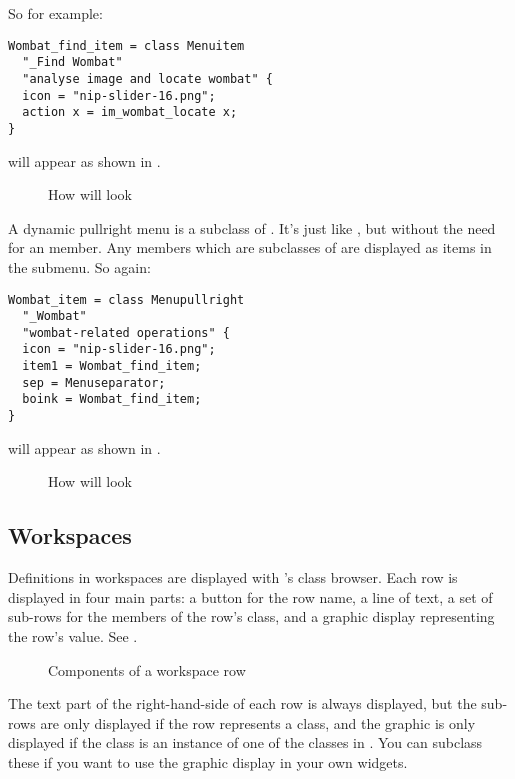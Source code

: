 So for example:

\begin{verbatim}
Wombat_find_item = class Menuitem
  "_Find Wombat"
  "analyse image and locate wombat" {
  icon = "nip-slider-16.png";
  action x = im_wombat_locate x;
}
\end{verbatim}

\noindent
will appear as shown in .

\begin{figure}
\caption{How  will look}
\end{figure}

A dynamic pullright menu is a subclass of . It's just like
, but without the need for an  member. Any members
which are subclasses of  are displayed as items in the submenu. So
again:

\begin{verbatim}
Wombat_item = class Menupullright
  "_Wombat"
  "wombat-related operations" {
  icon = "nip-slider-16.png";
  item1 = Wombat_find_item;
  sep = Menuseparator;
  boink = Wombat_find_item;
}
\end{verbatim}

\noindent
will appear as shown in .

\begin{figure}
\caption{How  will look}
\end{figure}

\subsection{Workspaces}

Definitions in workspaces are displayed with \nip{}'s class browser. Each row
is displayed in four main parts: a button for the row name, a line of text,
a set of sub-rows for the members of the row's class, and a graphic display
representing the row's value. See .

\begin{figure}
\caption{Components of a workspace row}
\end{figure}

The text part of the right-hand-side of each row is always displayed, but the
sub-rows are only displayed if the row represents a class, and the graphic is
only displayed if the class is an instance of one of the classes in
. You can subclass these if you want to use the graphic
display in your own widgets.

